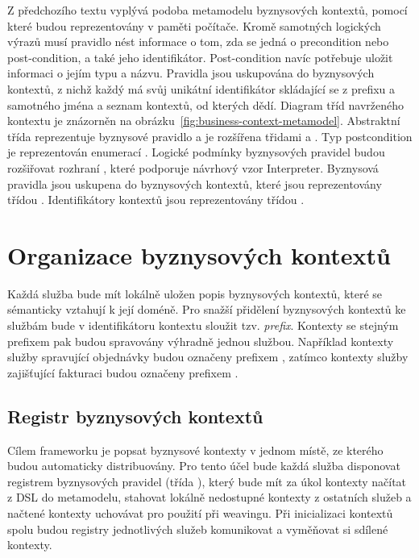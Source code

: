 Z předchozího textu vyplývá podoba metamodelu byznysových kontextů, pomocí které
budou reprezentovány v paměti počítače. Kromě samotných logických výrazů musí pravidlo nést
informace o tom, zda se jedná o precondition nebo post-condition, a také jeho identifikátor.
Post-condition navíc potřebuje uložit informaci o jejím typu a názvu. Pravidla jsou uskupována
do byznysových kontextů, z nichž každý má svůj unikátní identifikátor skládající se z prefixu
a samotného jména a seznam kontextů, od kterých dědí. Diagram tříd navrženého kontextu je znázorněn
na obrázku~\ref{fig:business-context-metamodel}. Abstraktní třída  reprezentuje
byznysové pravidlo a je rozšířena třidami  a . Typ
postcondition je reprezentován enumerací . Logické podmínky
byznysových pravidel budou rozšiřovat rozhraní , které podporuje návrhový vzor
Interpreter. Byznysová pravidla jsou uskupena do byznysových kontextů, které jsou reprezentovány
třídou . Identifikátory kontextů jsou reprezentovány třídou .

\section{Organizace byznysových kontextů}

Každá služba bude mít lokálně uložen popis byznysových kontextů, které se sémanticky vztahují
k její doméně. Pro snažší přidělení byznysových kontextů ke službám bude v identifikátoru kontextu sloužit
tzv. \textit{prefix}. Kontexty se stejným prefixem pak budou spravovány výhradně jednou službou. Například kontexty
služby spravující objednávky budou označeny prefixem , zatímco kontexty služby zajišťující fakturaci budou
označeny prefixem .

\subsection{Registr byznysových kontextů}\label{sec:registry-design}

Cílem frameworku je popsat byznysové kontexty v jednom místě, ze kterého budou
automaticky distribuovány. Pro tento účel bude každá služba disponovat registrem byznysových pravidel
(třída ), který bude mít za úkol kontexty načítat z \gls{DSL} do metamodelu,
stahovat lokálně nedostupné kontexty z ostatních služeb a načtené kontexty uchovávat pro použití při weavingu.
Při inicializaci kontextů spolu budou registry jednotlivých služeb komunikovat a vyměňovat si sdílené kontexty.

